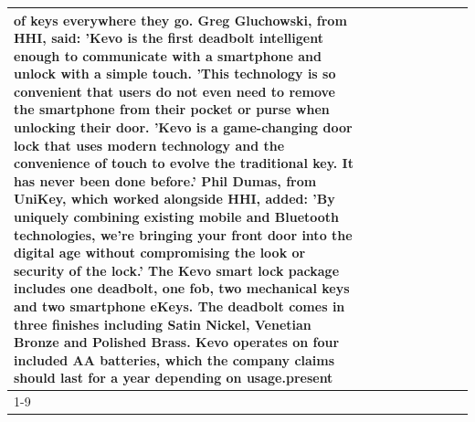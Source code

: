 \begin{table}[H]
\begin{tabular}{lllrlllll}
of keys everywhere they go. Greg Gluchowski, from HHI, said: 'Kevo is the first deadbolt intelligent enough to communicate with a smartphone and unlock with a simple touch. 'This technology is so convenient that users do not even need to remove the smartphone from their pocket or purse when unlocking their door. 'Kevo is a game-changing door lock that uses modern technology and the convenience of touch to evolve the traditional key. It has never been done before.' Phil Dumas, from UniKey, which worked alongside HHI, added: 'By uniquely combining existing mobile and Bluetooth technologies, we’re bringing your front door into the digital age without compromising the look or security of the lock.' The Kevo smart lock package includes one deadbolt, one fob, two mechanical keys and two smartphone eKeys. The deadbolt comes in three finishes including Satin Nickel, Venetian Bronze and Polished Brass. Kevo operates on four included AA batteries, which the company claims should last for a year depending on usage.present \\
\cline{1-9}

\end{tabular}
\end{table}
